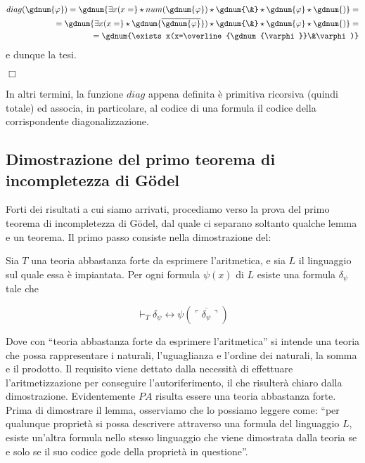 	\begin{eqnarray*}
	diag(\gdnum{\varphi})=\gdnum{\exists x(x=}\star num(\gdnum{\varphi})
	\star\gdnum{\&}\star \gdnum{\varphi}\star\gdnum{)}=\\
	=\gdnum{\exists x(x=}\star \gdnum{\overline{\gdnum{\varphi}}})\star
	\gdnum{\&}\star \gdnum{\varphi}\star\gdnum{)}=\\
	=\gdnum{\exists x(x=\overline{\gdnum{\varphi}}\&\varphi)}
	\end{eqnarray*}
	e dunque la tesi.\begin{flushright}$\Box$\end{flushright}
	
	In altri termini, la funzione $diag$ appena definita \`e primitiva ricorsiva
	(quindi totale) ed associa, in particolare, al codice di una formula il codice
	della corrispondente diagonalizzazione.
	
\subsection{Dimostrazione del primo teorema di incompletezza di G\"odel}
	
	Forti dei risultati a cui siamo arrivati, procediamo verso la prova del
	primo teorema di incompletezza di G\"odel, dal quale ci separano soltanto
	qualche lemma e un teorema. Il primo passo consiste nella dimostrazione del:
	
	\begin{prop}
	\label{lem:diagLemma}
	Sia $T$ una teoria abbastanza forte da esprimere l'aritmetica, e sia
	$L$ il linguaggio sul quale essa \`e impiantata. Per ogni formula
	$\psi(x)$ di $L$ esiste una formula $\delta_\psi$ tale che
	
	$$
	\vdash_{T} \delta_\psi \leftrightarrow \psi(\overline{\ulcorner
	\delta_\psi \urcorner})
	$$
	\end{prop}
	Dove con  ``teoria abbastanza forte da esprimere l'aritmetica'' si intende
	una teoria che possa rappresentare i naturali, l'uguaglianza e l'ordine dei
	naturali, la somma e il prodotto. Il requisito viene dettato dalla necessit\`a
	di effettuare l'aritmetizzazione per conseguire l'autoriferimento, il che
	risulter\`a chiaro dalla dimostrazione. Evidentemente $PA$ risulta essere
	una teoria abbastanza forte. Prima di dimostrare il lemma, osserviamo che
	lo possiamo leggere come: ``per qualunque propriet\`a si possa descrivere
	attraverso una formula del linguaggio $L$, esiste un'altra formula nello
	stesso linguaggio che viene dimostrata dalla teoria se e solo se il suo
	codice gode della propriet\`a in questione''.
	
